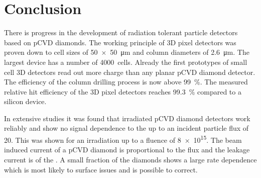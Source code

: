 \section{Conclusion}
There is progress in the development of radiation tolerant particle detectors based on \ac{pCVD} diamonds. The working principle of 3D pixel detectors was proven down to cell sizes of \SI{50x50}{\micro\meter} and column diameters of \SI{2.6}{\micro\meter}. The largest device has a number of \SI{4000}{cells}. Already the first prototypes of small cell 3D detectors read out more charge than any planar \ac{pCVD} diamond detector. The efficiency of the column drilling process is now above \SI{99}{\%}. The measured relative hit efficiency of the 3D pixel detectors reaches \SI{99.3}{\%} compared to a silicon device.\par
In extensive studies it was found that irradiated \ac{pCVD} diamond detectors work reliably and show no signal dependence to the  up to an incident particle flux of \SI{20}{\mhzcm}. This was shown for an irradiation up to a fluence of \SI{8e15}{\ncm}. The beam induced current of a \ac{pCVD} diamond is proportional to the flux and the leakage current is of the . A small fraction of the diamonds shows a large rate dependence which is most likely to surface issues and is possible to correct.

